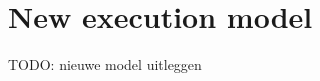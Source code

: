 \documentclass[../main]{subfiles}
\begin{document}
\section{New execution model}\label{sec:a-family-of-new-execution-models}

TODO: nieuwe model uitleggen

%
%
%
\end{document}
